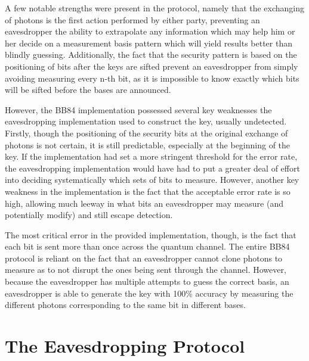 \documentclass{article}
\begin{document}
A few notable strengths were present in the protocol, namely that the exchanging of photons is the first action performed by either party, preventing an eavesdropper the ability to extrapolate any information which may help him or her decide on a measurement basis pattern which will yield results better than blindly guessing. Additionally, the fact that the security pattern is based on the positioning of bits after the keys are sifted prevent an eavesdropper from simply avoiding measuring every n-th bit, as it is impossible to know exactly which bits will be sifted before the bases are announced.

However, the BB84 implementation possessed several key weaknesses the eavesdropping implementation used to construct the key, usually undetected. Firstly, though the positioning of the security bits at the original exchange of photons is not certain, it is still predictable, especially at the beginning of the key. If the implementation had set a more stringent threshold for the error rate, the eavesdropping implementation would have had to put a greater deal of effort into deciding systematically which sets of bits to measure. However, another key weakness in the implementation is the fact that the acceptable error rate is so high, allowing much leeway in what bits an eavesdropper may measure (and potentially modify) and still escape detection.

The most critical error in the provided implementation, though, is the fact that each bit is sent more than once across the quantum channel. The entire BB84 protocol is reliant on the fact that an eavesdropper cannot clone photons to measure as to not disrupt the ones being sent through the channel. However, because the eavesdropper has multiple attempts to guess the correct basis, an eavesdropper is able to generate the key with 100\% accuracy by measuring the different photons corresponding to the same bit in different bases.

\section{The Eavesdropping Protocol}
\end{document}
